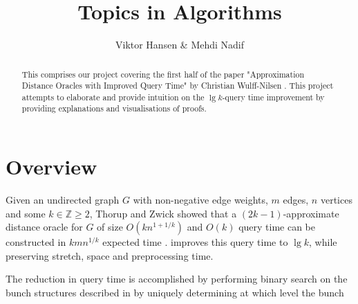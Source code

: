 \documentclass[12pt]{article}
\begin{document}
\nocite{*}


\title{Topics in Algorithms}

\author{Viktor Hansen \& Mehdi Nadif}

\maketitle

\begin{abstract}
  This comprises our project covering the first half of the paper "Approximation Distance Oracles with Improved Query Time" by Christian Wulff-Nilsen \cite{Wulff2013}. This project attempts to elaborate and provide intuition on the $\lg k$-query time improvement by providing explanations and visualisations of proofs.
\end{abstract}

\pagebreak

\section{Overview}
Given an undirected graph $G$ with non-negative edge weights, $m$ edges, $n$ vertices and some $k \in \mathbb{Z} \geq 2$, Thorup and Zwick showed that a $(2k-1)$-approximate distance oracle for $G$ of size $O(kn^{1+1/k})$ and $O(k)$ query time can be constructed in $kmn^{1/k}$ expected time \cite{Thorup2005}. \cite{Wulff2013} improves this query time to $\lg k$, while preserving stretch, space and preprocessing time. %

The reduction in query time is accomplished by performing binary search on the bunch structures described in \cite{Thorup2005} by uniquely determining at which level the bunch 



\end{document}
